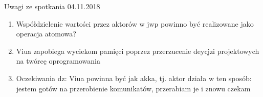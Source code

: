 \documentclass[11pt,oneside,a4paper,onecolumn]{article}
\begin{document}
Uwagi ze spotkania 04.11.2018
\begin{enumerate}
\item	Współdzielenie wartości przez aktorów w jwp powinno być realizowane jako operacja atomowa?
\item	Viua zapobiega wyciekom pamięci poprzez przerzucenie deycjzi projektowych na twórcę oprogramowania
\item	Oczekiwania dz: Viua powinna być jak akka, tj. aktor działa w ten sposób: jestem gotów na przerobienie komunikatów, przerabiam je i znowu czekam
\end{enumerate}
\end{document}
